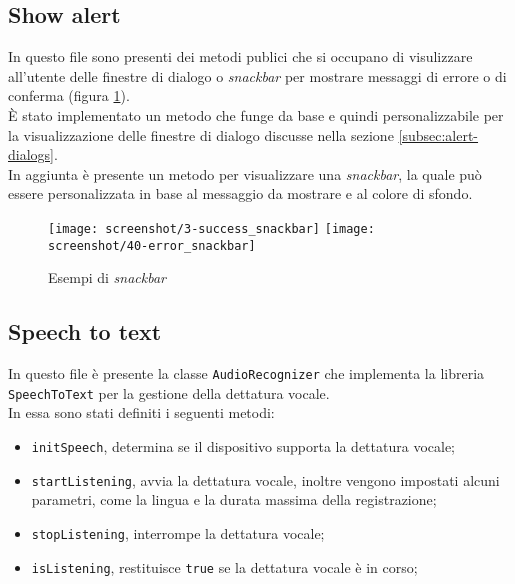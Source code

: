 \subsection{Show alert}
\label{subsec:show-alert}

In questo file sono presenti dei metodi publici che si occupano di visulizzare all'utente delle finestre di dialogo o \emph{snackbar}\cite{site:snackbar} per mostrare messaggi di errore o di conferma (figura \ref{fig:snackbar}). \\
È stato implementato un metodo che funge da base e quindi personalizzabile per la visualizzazione delle finestre di dialogo discusse nella sezione \ref{subsec:alert-dialogs}. \\
In aggiunta è presente un metodo per visualizzare una \emph{snackbar}, la quale può essere personalizzata in base al messaggio da mostrare e al colore di sfondo.

\begin{figure}[!h] 
    \centering 
    \texttt{[image: screenshot/3-success\_snackbar]} 
    \hfill
    \texttt{[image: screenshot/40-error\_snackbar]}
    \caption{Esempi di \emph{snackbar}}
    \label{fig:snackbar}
\end{figure}

\newpage

\subsection{Speech to text}
\label{subsec:speech-to-text}

In questo file è presente la classe \lstinline{AudioRecognizer} che implementa la libreria \lstinline{SpeechToText}\cite{site:speech-to-text} per la gestione della dettatura vocale. \\
In essa sono stati definiti i seguenti metodi:
\begin{itemize}
    \item \lstinline{initSpeech}, determina se il dispositivo supporta la dettatura vocale;
    \item \lstinline{startListening}, avvia la dettatura vocale, inoltre vengono impostati alcuni parametri, come la lingua e la durata massima della registrazione;
    \item \lstinline{stopListening}, interrompe la dettatura vocale;
    \item \lstinline{isListening}, restituisce \lstinline{true} se la dettatura vocale è in corso;
\end{itemize}


